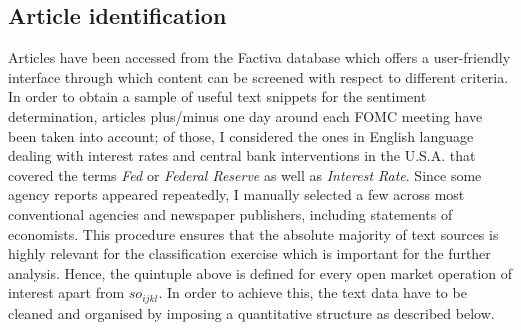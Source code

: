 \subsection{Article identification}\label{subsec:ArticleID}

Articles have been accessed from the Factiva database which offers a user-friendly interface through which content can be screened with respect to different criteria. In order to obtain a sample of useful text snippets for the sentiment determination, articles plus/minus one day around each FOMC meeting have been taken into account; of those, I considered the ones in English language dealing with interest rates and central bank interventions in the U.S.A. that covered the terms \textit{Fed} or \textit{Federal Reserve} as well as \textit{Interest Rate}. Since some agency reports appeared repeatedly, I manually selected a few across most conventional agencies and newspaper publishers, including statements of economists. This procedure ensures that the absolute majority of text sources is highly relevant for the classification exercise which is important for the further analysis. Hence, the quintuple above is defined for every open market operation of interest apart from $so_{ijkl}$. In order to achieve this, the text data have to be cleaned and organised by imposing a quantitative structure as described below.
%
%

